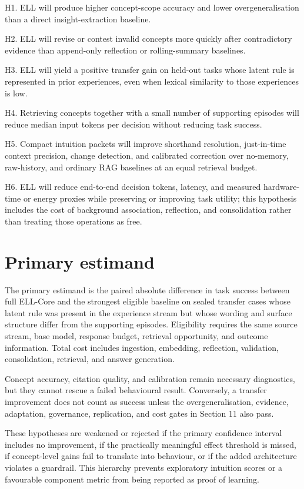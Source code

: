 \documentclass[
  english,
  a4paper,
  DIV=11,
  numbers=noendperiod]{scrreprt}
\begin{document}
H1. ELL will produce higher concept-scope accuracy and lower
overgeneralisation than a direct insight-extraction baseline.

H2. ELL will revise or contest invalid concepts more quickly after
contradictory evidence than append-only reflection or rolling-summary
baselines.

H3. ELL will yield a positive transfer gain on held-out tasks whose
latent rule is represented in prior experiences, even when lexical
similarity to those experiences is low.

H4. Retrieving concepts together with a small number of supporting
episodes will reduce median input tokens per decision without reducing
task success.

H5. Compact intuition packets will improve shorthand resolution,
just-in-time context precision, change detection, and calibrated
correction over no-memory, raw-history, and ordinary RAG baselines at an
equal retrieval budget.

H6. ELL will reduce end-to-end decision tokens, latency, and measured
hardware-time or energy proxies while preserving or improving task
utility; this hypothesis includes the cost of background association,
reflection, and consolidation rather than treating those operations as
free.

\section{Primary estimand}\label{primary-estimand}

The primary estimand is the paired absolute difference in task success
between full ELL-Core and the strongest eligible baseline on sealed
transfer cases whose latent rule was present in the experience stream
but whose wording and surface structure differ from the supporting
episodes. Eligibility requires the same source stream, base model,
response budget, retrieval opportunity, and outcome information. Total
cost includes ingestion, embedding, reflection, validation,
consolidation, retrieval, and answer generation.

Concept accuracy, citation quality, and calibration remain necessary
diagnostics, but they cannot rescue a failed behavioural result.
Conversely, a transfer improvement does not count as success unless the
overgeneralisation, evidence, adaptation, governance, replication, and
cost gates in Section 11 also pass.

These hypotheses are weakened or rejected if the primary confidence
interval includes no improvement, if the practically meaningful effect
threshold is missed, if concept-level gains fail to translate into
behaviour, or if the added architecture violates a guardrail. This
hierarchy prevents exploratory intuition scores or a favourable
component metric from being reported as proof of learning.
\end{document}
